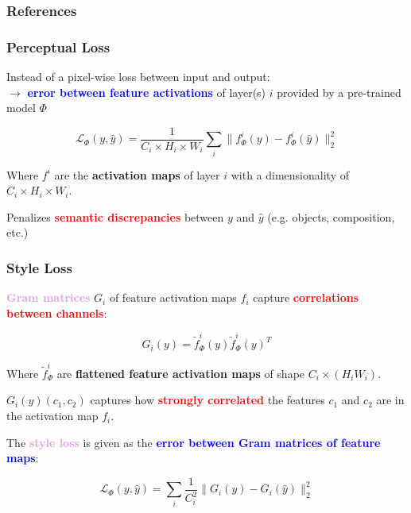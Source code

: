 \documentclass[11pt,xcolor=dvipsnames]{beamer}
\begin{document}
\begin{frame}[allowframebreaks]
        \frametitle{References}


        \printbibliography
\end{frame}

\begin{frame}
	\frametitle{Perceptual Loss}
	
Instead of a pixel-wise loss between input and output: \\
$\rightarrow$ \textbf{\textcolor{blue}{error between feature activations}} of layer(s) $i$ provided by a pre-trained model $\Phi$
\vspace{10pt}

\begin{equation*}
	\mathcal{L}_{\Phi}(y, \hat{y}) = \frac{1}{C_i \times H_i \times W_i} \sum_i\lVert f^i_{\Phi}(y) - f^i_{\Phi}(\hat{y}) \rVert^2_2
\end{equation*}
\vspace{10pt}

Where $f^i$ are the \textbf{activation maps} of layer $i$ with a dimensionality of $C_i \times H_i \times W_i$.
\vspace{10pt}

Penalizes \textcolor{red}{\textbf{semantic discrepancies}} between $y$ and $\hat{y}$ (e.g. objects, composition, etc.)

\end{frame}

\begin{frame}
	\frametitle{Style Loss}

\textbf{\textcolor{Plum}{Gram matrices}} $G_i$ of feature activation maps  $f_i$ capture \textbf{\textcolor{red}{correlations between channels}}:

\begin{equation*}
	G_i(y) = \tilde{f}_{\Phi}^i(y) \tilde{f}_{\Phi}^i(y)^T
\end{equation*}

Where $\tilde{f}^i_{\Phi}$ are \textbf{flattened feature activation maps} of shape $C_i \times (H_i W_i)$.
\vspace{10pt}

$G_i(y)(c_1, c_2)$ captures how \textcolor{red}{\textbf{strongly correlated}} the features $c_1$ and $c_2$ are in the activation map $f_i$.

\vspace{10pt}	
	
The \textbf{\textcolor{Plum}{style loss}} is given as the \textbf{\textcolor{blue}{error between Gram matrices of feature maps}}:

\begin{equation*}
	\mathcal{L}_{\Phi}(y, \hat{y}) = \sum_i \frac{1}{C_i^2} \lVert G_i(y) - G_i(\hat{y}) \rVert^2_2
\end{equation*}
	
\end{frame}
\end{document}

